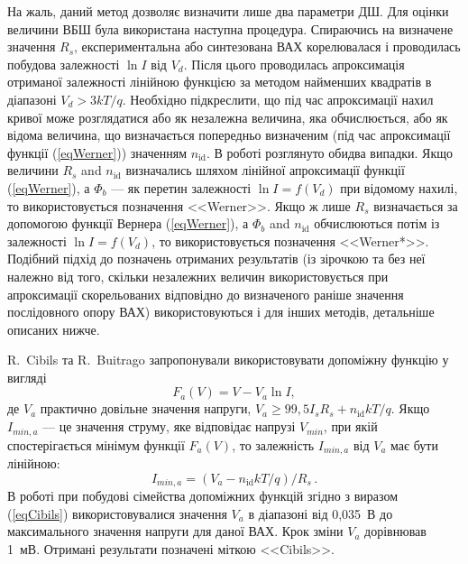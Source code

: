 На жаль, даний метод дозволяє визначити лише два параметри ДШ.
Для оцінки величини ВБШ була використана наступна процедура.
Спираючись на визначене значення $R_s$, експериментальна або синтезована ВАХ корелювалася і проводилась побудова залежності  $\ln I$ від $V_d$.
Після цього проводилась апроксимація отриманої залежності лінійною функцією за методом найменших квадратів \cite[с.~67]{KalitkinBook} в діапазоні $V_d>3kT/q$.
Необхідно підкреслити, що під час апроксимації нахил кривої може розглядатися або як незалежна величина, яка обчислюється, або як відома величина, що визначається попередньо визначеним (під час апроксимації функції (\ref{eqWerner})) значенням $n_\mathrm{id}$.
В роботі розглянуто обидва випадки.
Якщо величини $R_s$ and $n_\mathrm{id}$ визначались шляхом лінійної апроксимації функції (\ref{eqWerner}), а $\Phi_b$ --- як перетин залежності $\ln I=f(V_d)$ при відомому нахилі, то використовується позначення <<Werner>>.
Якщо ж лише $R_s$ визначається за допомогою функції Вернера (\ref{eqWerner}), а $\Phi_b$ and $n_\mathrm{id}$ обчислюються потім із залежності $\ln I=f(V_d)$, то використовується позначення <<Werner*>>.
Подібний підхід до позначень отриманих результатів (із зірочкою та без неї належно від того, скільки незалежних величин використовується при апроксимації скорельованих відповідно до визначеного раніше значення послідовного опору ВАХ) використовуються і для інших методів, детальніше описаних нижче.

R.~Cibils  та R.~Buitrago \cite{Cibils} запропонували використовувати допоміжну функцію у вигляді
\begin{equation}
\label{eqCibils}
F_a(V)=V-V_a\ln I,
\end{equation}
де
$V_a$ практично довільне значення напруги, $V_a\geq99,5I_sR_s+n_\mathrm{id}kT/q$.
Якщо $I_{min,a}$ --- це значення струму, яке відповідає напрузі $V_{min}$, при якій спостерігається мінімум функції $F_a(V)$,
то залежність $I_{min,a}$ від $V_a$ має бути \cite{Cibils} лінійною:
\begin{equation}
\label{eqCibilsDet}
I_{min,a}=(V_a-n_\mathrm{id}kT/q)/R_s\,.
\end{equation}
В роботі при побудові сімейства допоміжних функцій згідно з виразом (\ref{eqCibils}) використовувалися значення  $V_a$ в діапазоні від 0,035~В до максимального значення напруги для даної ВАХ.
Крок зміни $V_a$ дорівнював 1~мВ.
Отримані результати позначені міткою <<Cibils>>.

